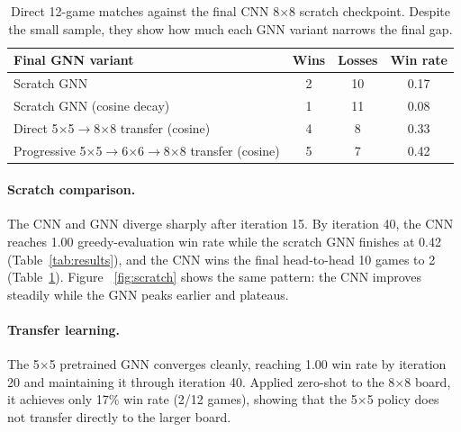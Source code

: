\documentclass{article}
\begin{document}
\begin{table}[t]
\centering
\small
\begin{tabular}{lccc}
\toprule
Final GNN variant & Wins & Losses & Win rate \\
\midrule
Scratch GNN                         & 2 & 10 & 0.17 \\
Scratch GNN (cosine decay)          & 1 & 11 & 0.08 \\
Direct 5$\times$5$\rightarrow$8$\times$8 transfer (cosine) & 4 & 8 & 0.33 \\
Progressive 5$\times$5$\rightarrow$6$\times$6$\rightarrow$8$\times$8 transfer (cosine) & 5 & 7 & 0.42 \\
\bottomrule
\end{tabular}
\caption{Direct 12-game matches against the final CNN 8$\times$8 scratch checkpoint. Despite the
small sample, they show how much each GNN variant narrows the final gap.}
\label{tab:head_to_head}
\end{table}

\paragraph{Scratch comparison.}
The CNN and GNN diverge sharply after iteration 15. By iteration 40, the CNN reaches 1.00
greedy-evaluation win rate while the scratch GNN finishes at 0.42 (Table~\ref{tab:results}),
and the CNN wins the final head-to-head 10 games to 2 (Table~\ref{tab:head_to_head}). Figure
~\ref{fig:scratch} shows the same pattern: the CNN improves steadily while the GNN peaks earlier
and plateaus.

\paragraph{Transfer learning.}
The 5$\times$5 pretrained GNN converges cleanly, reaching 1.00 win rate by iteration 20 and
maintaining it through iteration 40.
Applied zero-shot to the 8$\times$8 board, it achieves only 17\% win rate (2/12 games), showing
that the 5$\times$5 policy does not transfer directly to the larger board.
\end{document}

